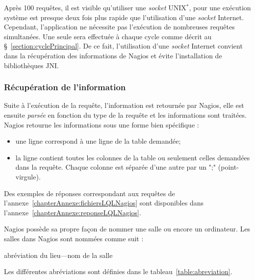 Apr\`es 100 requ\^etes, il est visible qu'utiliser une \textit{socket} UNIX$^*$, pour une ex\'ecution syst\`eme est presque deux fois plus rapide que l'utilisation d'une \textit{socket} Internet.
Cependant, l'application ne n\'ecessite pas l'ex\'ecution de nombreuses requ\^etes simultan\'ees.
Une seule sera effectu\'ee \`a chaque cycle comme d\'ecrit au \S~\ref{section:cyclePrincipal}.
De ce fait, l'utilisation d'une \textit{socket} Internet convient dans la r\'ecup\'eration des informations de Nagios et \'evite l'installation de biblioth\`eques JNI.

\subsubsection{R\'ecup\'eration de l'information}

Suite \`a l'ex\'ecution de la requ\^ete, l'information est retourn\'ee par Nagios, elle est ensuite \textit{pars\'ee} en fonction du type de la requ\^ete et les informations sont trait\'ees.
Nagios retourne les informations sous une forme bien sp\'ecifique : 

\begin{itemize}
	\item une ligne correspond \`a une ligne de la table demand\'ee;
	\item la ligne contient toutes les colonnes de la table ou seulement celles demand\'ees dans la requ\^ete.
	Chaque colonne est s\'epar\'ee d'une autre par un \textsf{";" (point-virgule)}.

\end{itemize}

\vspace{0.20cm}

Des exemples de r\'eponses correspondant aux requ\^etes de l'annexe~\ref{chapterAnnexe:fichiersLQLNagios} sont disponibles dans l'annexe~\ref{chapterAnnexe:reponseLQLNagios}.

Nagios poss\`ede sa propre fa\c{c}on de nommer une salle ou encore un ordinateur.
\noindent Les salles dans Nagios sont nomm\'ees comme suit : 

\begin{center}
	\textsf{abr\'eviation du lieu---nom de la salle}

\end{center}

\noindent Les diff\'erentes abr\'eviations sont d\'efinies dans le tableau~\ref{table:abreviation}.

\clearpage

